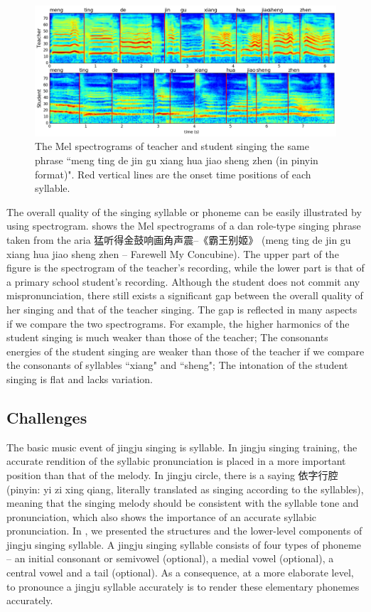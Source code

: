 \begin{figure}[ht!]
\includegraphics[width=\textwidth]{figs/spectro_vis/ch3_overall_qua.png}
\caption{The Mel spectrograms of teacher and student singing the same phrase ``meng ting de jin gu xiang hua jiao sheng zhen (in pinyin format)". Red vertical lines are the onset time positions of each syllable.}
\label{fig:overall_qua}
\end{figure}


The overall quality of the singing syllable or phoneme can be easily illustrated by using spectrogram.  shows the Mel spectrograms of a dan role-type singing phrase taken from the aria 猛听得金鼓响画角声震--《霸王别姬》 (meng ting de jin gu xiang hua jiao sheng zhen -- Farewell My Concubine). The upper part of the figure is the spectrogram of the teacher's recording, while the lower part is that of a primary school student's recording. Although the student does not commit any mispronunciation, there still exists a significant gap between the overall quality of her singing and that of the teacher singing. The gap is reflected in many aspects if we compare the two spectrograms. For example, the higher harmonics of the student singing is much weaker than those of the teacher; The consonants energies of the student singing are weaker than those of the teacher if we compare the consonants of syllables ``xiang" and ``sheng"; The intonation of the student singing is flat and lacks variation. 

\subsection{Challenges}\label{sec:ch3:challenges}

The basic music event of jingju singing is syllable. In jingju singing training, the accurate rendition of the syllabic pronunciation is placed in a more important position than that of the melody. In jingju circle, there is a saying 依字行腔 (pinyin: yi zi xing qiang, literally translated as singing according to the syllables), meaning that the singing melody should be consistent with the syllable tone and pronunciation, which also shows the importance of an accurate syllabic pronunciation. In , we presented the structures and the lower-level components of jingju singing syllable. A jingju singing syllable consists of four types of phoneme -- an initial consonant or semivowel (optional), a medial vowel (optional), a central vowel and a tail (optional). As a consequence, at a more elaborate level, to pronounce a jingju syllable accurately is to render these elementary phonemes accurately.

